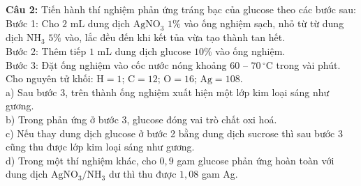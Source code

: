 \documentclass[12pt,a4paper]{article}
\begin{document}
\par\noindent\begin{minipage}{\linewidth}
\noindent \textbf{Câu 2:} Tiến hành thí nghiệm phản ứng tráng bạc của glucose theo các bước sau:\\
Bước 1: Cho $2$ mL dung dịch $\text{AgNO}_3$ $1\%$ vào ống nghiệm sạch, nhỏ từ từ dung dịch $\text{NH}_3$ $5\%$ vào, lắc đều đến khi kết tủa vừa tạo thành tan hết.\\
Bước 2: Thêm tiếp $1$ mL dung dịch glucose $10\%$ vào ống nghiệm.\\
Bước 3: Đặt ống nghiệm vào cốc nước nóng khoảng $60$ -- $70\,^{\circ}\text{C}$ trong vài phút.\\
Cho nguyên tử khối: $\text{H} = 1$; $\text{C} = 12$; $\text{O} = 16$; $\text{Ag} = 108$.\\
\noindent a) Sau bước 3, trên thành ống nghiệm xuất hiện một lớp kim loại sáng như gương.\\

\noindent b) Trong phản ứng ở bước 3, glucose đóng vai trò chất oxi hoá.\\

\noindent c) Nếu thay dung dịch glucose ở bước 2 bằng dung dịch sucrose thì sau bước 3 cũng thu được lớp kim loại sáng như gương.\\

\noindent d) Trong một thí nghiệm khác, cho $0{,}9$ gam glucose phản ứng hoàn toàn với dung dịch $\mathrm{AgNO_3/NH_3}$ dư thì thu được $1{,}08$ gam Ag.\\
\end{minipage}\par\vspace{0.12cm}
\end{document}
